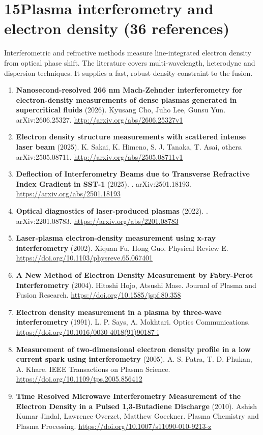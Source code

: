 \documentclass[11pt,a4paper]{article}
\begin{document}
\section*{15\quad Plasma interferometry and electron density \textnormal{(\normalsize 36 references)}}
Interferometric and refractive methods measure line-integrated electron density from optical phase shift. The literature covers multi-wavelength, heterodyne and dispersion techniques. It supplies a fast, robust density constraint to the fusion.
\begin{enumerate}[leftmargin=1.4em]
\item \textbf{Nanosecond-resolved 266 nm Mach-Zehnder interferometry for electron-density measurements of dense plasmas generated in supercritical fluids} (2026). Kyusang Cho, Juho Lee, Gunsu Yun. arXiv:2606.25327. \url{http://arxiv.org/abs/2606.25327v1}
\item \textbf{Electron density structure measurements with scattered intense laser beam} (2025). K. Sakai, K. Himeno, S. J. Tanaka, T. Asai, others. arXiv:2505.08711. \url{http://arxiv.org/abs/2505.08711v1}
\item \textbf{Deflection of Interferometry Beams due to Transverse Refractive Index Gradient in SST-1} (2025). . arXiv:2501.18193. \url{https://arxiv.org/abs/2501.18193}
\item \textbf{Optical diagnostics of laser-produced plasmas} (2022). . arXiv:2201.08783. \url{https://arxiv.org/abs/2201.08783}
\item \textbf{Laser-plasma electron-density measurement using x-ray interferometry} (2002). Xiquan Fu, Hong Guo. Physical Review E. \url{https://doi.org/10.1103/physreve.65.067401}
\item \textbf{A New Method of Electron Density Measurement by Fabry-Perot Interferometry} (2004). Hitoshi Hojo, Atsushi Mase. Journal of Plasma and Fusion Research. \url{https://doi.org/10.1585/jspf.80.358}
\item \textbf{Electron density measurement in a plasma by three-wave interferometry} (1991). L. P. Says, A. Mokhtari. Optics Communications. \url{https://doi.org/10.1016/0030-4018(91)90187-i}
\item \textbf{Measurement of two-dimensional electron density profile in a low current spark using interferometry} (2005). A. S. Patra, T. D. Phukan, A. Khare. IEEE Transactions on Plasma Science. \url{https://doi.org/10.1109/tps.2005.856412}
\item \textbf{Time Resolved Microwave Interferometry Measurement of the Electron Density in a Pulsed 1,3-Butadiene Discharge} (2010). Ashish Kumar Jindal, Lawrence Overzet, Matthew Goeckner. Plasma Chemistry and Plasma Processing. \url{https://doi.org/10.1007/s11090-010-9213-z}

\end{enumerate}
\end{document}
